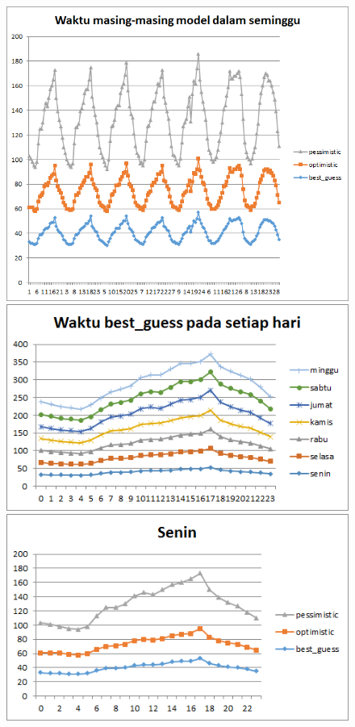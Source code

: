 					\begin{figure}[H]
				\centering		
				\includegraphics[scale=0.8]{Gambar/waktuallmodelsampel115052017.png}
				\includegraphics[]{Gambar/waktubestguesssampel115052017.png}
				\includegraphics[]{Gambar/seninsampel115052017.png}
			\end{figure}
			
